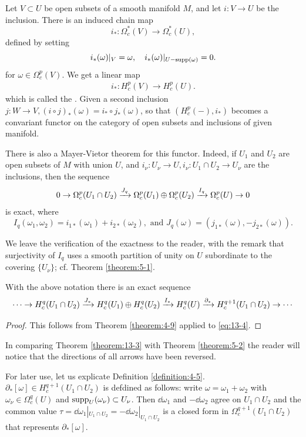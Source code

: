 Let $V\subset U$ be open subsets of a smooth manifold $M$, and let $i: V\to U$ be the
inclusion. There is an induced chain map
\[
  i_*:\Omega_c^*(V)\to\Omega_c^*(U),
\]
defined by setting 
\[
  i_*(\omega)|_V = \omega,\quad i_*(\omega)|_{U-\operatorname{supp}(\omega)} = 0.
\]
for $\omega\in\Omega_c^p(V)$. We get a linear map 
\begin{align}\label{eq:13-3}
  i_*:H_c^p(V)\to H_c^p(U).
\end{align}
which is called the . Given a second inclusion $j:W\to V, (i\circ j)_*(\omega)=i_*\circ j_*(\omega)$,
so that $(H_c^p(-), i_*)$ becomes a convariant functor on the category of open subsets and inclusions of given manifold.

There is also a Mayer-Vietor theorem for this functor. Indeed, if $U_1$ and $U_2$ are open subsets of $M$ with union $U$,
and $i_\nu:U_\nu\to U,i_\nu:U_1\cap U_2\to U_\nu$ are the inclusions, then the sequence
\begin{align}\label{eq:13-4}
  0\ra\Omega_c^p(U_1\cap U_2)\xra[J_q]\Omega_c^p(U_1)\oplus\Omega_c^p(U_2)\xra[I_q]\Omega_c^p(U)\ra 0
\end{align}
is exact, where 
\[
  I_q(\omega_1, \omega_2) = i_{1*}(\omega_1) + i_{2*}(\omega_2),\text{ and } 
  J_q(\omega) = (j_{1*}(\omega), -j_{2*}(\omega)).
\]

We leave the verification of the exactness to the reader, with the remark that
surjectivity of $I_q$ uses a smooth partition of unity on $U$ subordinate to the covering $\{U_\nu\}$; 
cf. Theorem \ref{theorem:5-1}.


\begin{theorem}\label{theorem:13-3}
  With the above notation there is an exact sequence
  \[
    \cdots\ra H_c^q(U_1\cap U_2)\xra[J_*] H_c^q(U_1)\oplus H_c^q(U_2)\xra[I_*] H_c^q(U)\xra[\partial_*] H_c^{q+1}(U_1\cap U_2)\ra\cdots
  \]
\end{theorem}

\begin{proof}
  This follows from Theorem \ref{theorem:4-9} applied to \eqref{eq:13-4}.
\end{proof}

In comparing Theorem \ref{theorem:13-3} with Theorem \ref{theorem:5-2} the reader will notice that the
directions of all arrows have been reversed.

For later use, let us explicate Definition \ref{definition:4-5}. $\partial_*[\omega]\in H_c^{q+1}(U_1\cap U_2)$ 
is defdined as follows: write $\omega=\omega_1+\omega_2$ with $\omega_\nu\in\Omega_c^q(U)$ and $\operatorname{supp}_U(\omega_\nu)\subset U_\nu$.
Then $\dd\omega_1$ and $-\dd\omega_2$ agree on $U_1\cap U_2$ and the common value $\tau=\dd\omega_1|_{U_1\cap U_2} = -\dd\omega_2|_{U_1\cap U_2}$
is a closed form in $\Omega_c^{q+1}(U_1\cap U_2)$ that represents $\partial_*[\omega]$.


